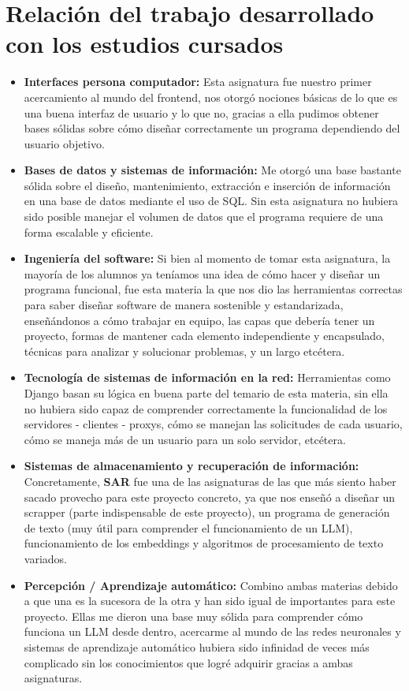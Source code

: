 \documentclass{article}
\begin{document}
\section{Relación del trabajo desarrollado con los estudios cursados}
\begin{itemize}
    \item \textbf{Interfaces persona computador:}  
    Esta asignatura fue nuestro primer acercamiento al mundo del frontend, nos otorgó nociones básicas de lo que es una buena interfaz de usuario y lo que no, gracias a ella pudimos obtener bases sólidas sobre cómo diseñar correctamente un programa dependiendo del usuario objetivo.

    \item \textbf{Bases de datos y sistemas de información:}  
    Me otorgó una base bastante sólida sobre el diseño, mantenimiento, extracción e inserción de información en una base de datos mediante el uso de SQL. Sin esta asignatura no hubiera sido posible manejar el volumen de datos que el programa requiere de una forma escalable y eficiente.

    \item \textbf{Ingeniería del software:}  
    Si bien al momento de tomar esta asignatura, la mayoría de los alumnos ya teníamos una idea de cómo hacer y diseñar un programa funcional, fue esta materia la que nos dio las herramientas correctas para saber diseñar software de manera sostenible y estandarizada, enseñándonos a cómo trabajar en equipo, las capas que debería tener un proyecto, formas de mantener cada elemento independiente y encapsulado, técnicas para analizar y solucionar problemas, y un largo etcétera.

    \item \textbf{Tecnología de sistemas de información en la red:}  
    Herramientas como Django basan su lógica en buena parte del temario de esta materia, sin ella no hubiera sido capaz de comprender correctamente la funcionalidad de los servidores - clientes - proxys, cómo se manejan las solicitudes de cada usuario, cómo se maneja más de un usuario para un solo servidor, etcétera.

    \item \textbf{Sistemas de almacenamiento y recuperación de información:}  
    Concretamente, \textbf{SAR} fue una de las asignaturas de las que más siento haber sacado provecho para este proyecto concreto, ya que nos enseñó a diseñar un scrapper (parte indispensable de este proyecto), un programa de generación de texto (muy útil para comprender el funcionamiento de un LLM), funcionamiento de los embeddings y algoritmos de procesamiento de texto variados.

    \item \textbf{Percepción / Aprendizaje automático:}  
    Combino ambas materias debido a que una es la sucesora de la otra y han sido igual de importantes para este proyecto. Ellas me dieron una base muy sólida para comprender cómo funciona un LLM desde dentro, acercarme al mundo de las redes neuronales y sistemas de aprendizaje automático hubiera sido infinidad de veces más complicado sin los conocimientos que logré adquirir gracias a ambas asignaturas.
\end{itemize}
\end{document}

